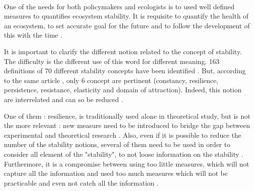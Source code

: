 \documentclass{article}
\begin{document}
\paragraph{} %
One of the needs for both policymakers and ecologists is to used well defined measures to quantifies ecosystem stability. It is requisite to quantify the health of an ecosystem, to set accurate goal for the future and to follow the development of this with the time \cite{donohue_navigating_2016} \cite{mayer2008strengths}. 

It is important to clarify the different notion related to the concept of stability. The difficulty is the different use of this word for different meaning. 163 definitions of 70 different stability concepts have been identified \cite{grimm1997babel}. %
But, according to the same article \cite{grimm1997babel}, only 6 concept are pertinent (constancy, resilience, persistence, resistance, elasticity and domain of attraction). Indeed, this notion are interrelated and can so be reduced \cite{donohue2013dimensionality}.

One of them : resilience, is traditionally used alone in theoretical study, but is not the more relevant : new measure need to be introduced to bridge the gap between experimental and theoretical research \cite{arnoldi2016resilience} \cite{gunderson2000ecological} \cite{neubert_alternatives_1997} . Also, even if it is possible to reduce the number of the stability notions, several of them need to be used in order to consider all element of the "stability", to not loose information on the stability \cite{derissen_relationship_2011}. Furthermore, it is a compromise between using too little measures, which will not capture all the information and used too much measures which will not be practicable and even not catch all the information \cite{hillebrand2018decomposing}.






\end{document}
